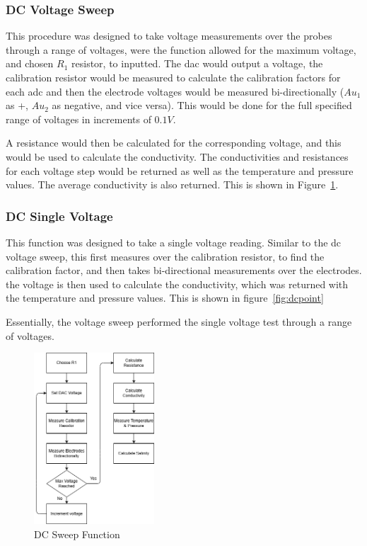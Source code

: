 \subsubsection{DC Voltage Sweep}
This procedure was designed to take voltage measurements over the probes through a range of voltages, were the function allowed for the maximum voltage, and chosen $R_1$ resistor, to inputted.
The \gls{dac} would output a voltage, the calibration resistor would be measured to calculate the calibration factors for each \gls{adc} and then the electrode voltages would be measured bi-directionally ($Au_1$ as +, $Au_2$ as negative, and vice versa).
This would be done for the full specified range of voltages in increments of $0.1V$.

A resistance would then be calculated for the corresponding voltage, and this would be used to calculate the conductivity.
The conductivities and resistances for each voltage step would be returned as well as the temperature and pressure values.
The average conductivity is also returned. This is shown in Figure~\ref{fig:dcsweep}.

\subsubsection{DC Single Voltage}
This function was designed to take a single voltage reading.
Similar to the \gls{dc} voltage sweep, this first measures over the calibration resistor, to find the calibration factor, and then takes bi-directional measurements over the electrodes.
the voltage is then used to calculate the conductivity, which was returned with the temperature and pressure values.
This is shown in figure~\ref{fig:dcpoint}

Essentially, the voltage sweep performed the single voltage test through a range of voltages.

\begin{figure}[H]
    \centering
    \includegraphics[width=0.4\textwidth]{figures/dcsweep.png}
    \caption{DC Sweep Function}
    \label{fig:dcsweep}
\end{figure}

